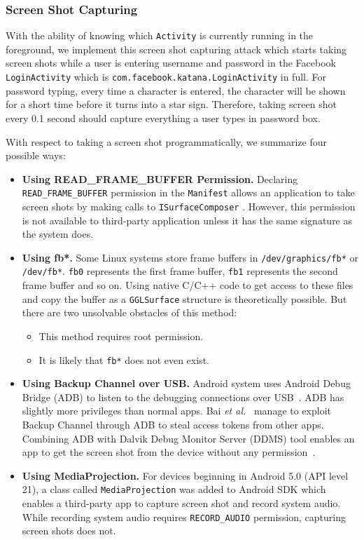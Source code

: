 \documentclass[letterpaper,12pt]{article}
\begin{document}
\subsubsection{Screen Shot Capturing}
With the ability of knowing which \texttt{Activity} is currently
running in the foreground, we implement this screen shot capturing
attack which starts taking screen shots while a user is entering
username and password in the Facebook \texttt{LoginActivity} which is
\texttt{com.facebook.katana.LoginActivity} in full. For password
typing, every time a character is entered, the character will be shown
for a short time before it turns into a star sign. Therefore, taking
screen shot every 0.1 second should capture everything a user types in
password box.


With respect to taking a screen shot programmatically, we summarize
four possible ways:
\begin{itemize}
\item {\bf Using READ\_FRAME\_BUFFER Permission.}  Declaring
  \texttt{READ\_FRAME\_BUFFER} permission in the \texttt{Manifest}
  allows an application to take screen shots by making calls to
  \texttt{ISurfaceComposer} \cite{framebuffer}. However, this
  permission is not available to third-party application unless it has
  the same signature as the system does.

\item {\bf Using fb*.} Some Linux systems store frame buffers in
  \texttt{/dev/graphics/fb*} or \texttt{/dev/fb*}. \texttt{fb0}
  represents the first frame buffer, \texttt{fb1} represents the
  second frame buffer and so on.  Using native C/C++ code to get
  access to these files and copy the buffer as a \texttt{GGLSurface}
  structure is theoretically possible. But there are two unsolvable
  obstacles of this method:
  \begin{itemize}
  \item This method requires root permission.
  \item It is likely that \texttt{fb*} does not even exist.
  \end{itemize}

\item {\bf Using Backup Channel over USB.}  Android system uses
  Android Debug Bridge (ADB) to listen to the debugging connections
  over USB~\cite{adb}. ADB has slightly more privileges than normal
  apps. Bai {\em et al.}~\cite{DBLP:conf/iceccs/BaiSWYLDG15} manage to
  exploit Backup Channel through ADB to steal access tokens from other
  apps. Combining ADB with Dalvik Debug Monitor Server (DDMS) tool
  enables an app to get the screen shot from the device without any
  permission~\cite{ddms}.

\item {\bf Using MediaProjection.}  For devices beginning in Android
  5.0 (API level 21), a class called \texttt{MediaProjection} was
  added to Android SDK which enables a third-party app to capture
  screen shot and record system audio\cite{mediaprojection}. While
  recording system audio requires \texttt{RECORD\_AUDIO} permission,
  capturing screen shots does not.
\end{itemize}
\end{document}
